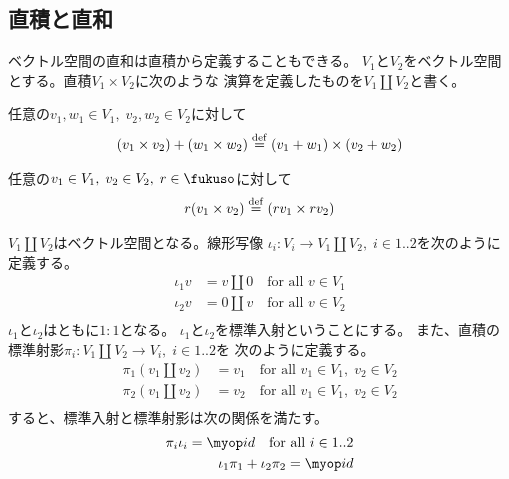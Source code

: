 \subsection{直積と直和}\label{s2:直積と直和} %
	ベクトル空間の直和は直積から定義することもできる。
	$V_1$と$V_2$をベクトル空間とする。直積$V_1\times V_2$に次のような
	演算を定義したものを$V_1\coprod V_2$と書く。
	\begin{description}\setlength{\itemsep}{-1mm} %
		\item[加法] 任意の$v_1,w_1\in V_1,\;v_2,w_2\in V_2$に対して
		\begin{equation*}\begin{split} %
			(v_1\times v_2) + (w_1\times w_2) \defeq (v_1 + w_1)\times (v_2 + w_2)
		\end{split}\end{equation*} %
		\item[係数] 任意の$v_1\in V_1,\;v_2\in V_2,\;r\in\fukuso$に対して
		\begin{equation*}\begin{split} %
			r(v_1\times v_2) \defeq (rv_1\times rv_2)
		\end{split}\end{equation*} %
	\end{description} %
	$V_1\coprod V_2$はベクトル空間となる。線形写像
	$\iota_i:V_i\to V_1\coprod V_2,\;i\in1..2$を次のように定義する。
	\begin{equation*}\begin{split} %
		\iota_1 v &= v\amalg 0  \quad\text{for all }v\in V_1 \\
		\iota_2 v &= 0\amalg v  \quad\text{for all }v\in V_2 \\
	\end{split}\end{equation*} %
	$\iota_1$と$\iota_2$はともに$1:1$となる。
	$\iota_1$と$\iota_2$を標準入射ということにする。
	また、直積の標準射影$\pi_i:V_1\coprod V_2\to V_i,\;i\in1..2$を
	次のように定義する。
	\begin{equation*}\begin{split} %
		\pi_1 (v_1\amalg v_2) &= v_1 \quad\text{for all }v_1\in V_1,\;v_2\in V_2 \\
		\pi_2 (v_1\amalg v_2) &= v_2 \quad\text{for all }v_1\in V_1,\;v_2\in V_2 \\
	\end{split}\end{equation*} %
	すると、標準入射と標準射影は次の関係を満たす。
	\begin{equation*}\begin{split} %
		\pi_i\iota_i = \myid \quad\text{for all }i\in 1..2 \\
		\iota_1\pi_1 + \iota_2\pi_2 = \myid \\
	\end{split}\end{equation*} %
